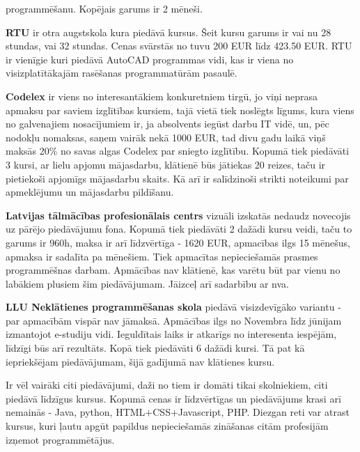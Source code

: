 programmēšanu. Kopējais garums ir 2 mēneši.
\par
\textbf{RTU} ir otra augstskola kura piedāvā kursus. Šeit kursu garums ir vai nu 28 stundas, vai 32 stundas.
Cenas svārstās no tuvu 200 EUR līdz 423.50 EUR. RTU ir vienīgie kuri piedāvā AutoCAD programmas vidi, kas ir
viena no visizplatītākajām rasēšanas programmatūrām pasaulē. 
\par
\textbf{Codelex} ir viens no interesantākiem konkuretniem tirgū, jo viņi neprasa apmaksu par saviem izglītības
kursiem, tajā vietā tiek noslēgts līgums, kura viens no galvenajiem nosacījumiem ir, ja absolvents iegūst darbu
IT vidē, un, pēc nodokļu nomaksas, saņem vairāk nekā 1000 EUR, tad divu gadu laikā viņš maksās 20\% no savas algas
Codelex par sniegto izglītību. Kopumā tiek piedāvāti 3 kursi, ar lielu apjomu mājasdarbu, klātienē būs jātiekas 20
reizes, taču ir pietiekoši apjomīgs mājasdarbu skaits. Kā arī ir salīdzinoši strikti noteikumi par apmeklējumu un
mājasdarbu pildīšanu.
\par
\textbf{Latvijas tālmācības profesionālais centrs} vizuāli izskatās nedaudz novecojis uz pārējo piedāvājumu fona.
Kopumā tiek piedāvāti 2 dažādi kursu veidi, taču to garums ir 960h, maksa ir arī līdzvērtīga - 1620 EUR, apmacības
ilgs 15 mēnešus, apmaksa ir sadalīta pa mēnešiem. Tiek apmacītas nepieciešamās prasmes programmēšnas darbam. Apmācības
nav klātienē, kas varētu būt par vienu no labākiem plusiem šim piedāvājumam. Jāizceļ arī sadarbību ar \acrshort{nva}.
\par
\textbf{LLU Neklātienes programmēšanas skola} piedāvā visizdevīgāko variantu - par apmacībām vispār nav jāmaksā.
Apmācības ilgs no Novembra līdz jūnijam izmantojot e-studiju vidi. Ieguldītais laiks ir atkarīgs no interesenta
iespējām, līdzīgi būs arī rezultāts. Kopā tiek piedāvāti 6 dažādi kursi. Tā pat kā iepriekšējam piedāvājumam, 
šijā gadījumā nav klātienes kursu.
\par
Ir vēl vairāki citi piedāvājumi, daži no tiem ir domāti tikai skolniekiem, citi piedāvā līdzīgus kursus. 
Kopumā cenas ir līdzvērtīgas un piedāvājums krasi arī nemainās - Java, python, HTML+CSS+Javascript, PHP.
Diezgan reti var atrast kursus, kuri ļautu apgūt papildus nepieciešamās zināšanas citām profesijām izņemot
programmētājus.

